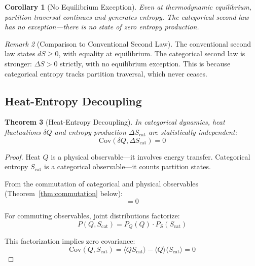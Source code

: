 \documentclass[twocolumn,10pt,a4paper]{article}
\newtheorem{theorem}{Theorem}[section]
\newtheorem{corollary}[theorem]{Corollary}
\theoremstyle{definition}
\theoremstyle{remark}
\newtheorem{remark}[theorem]{Remark}
\newcommand{\Ocat}{\hat{O}_{\mathrm{cat}}}
\newcommand{\Ophys}{\hat{O}_{\mathrm{phys}}}
\newcommand{\Scat}{S_{\mathrm{cat}}}
\begin{document}
\begin{corollary}[No Equilibrium Exception]
Even at thermodynamic equilibrium, partition traversal continues and generates entropy. The categorical second law has no exception---there is no state of zero entropy production.
\end{corollary}

\begin{remark}[Comparison to Conventional Second Law]
The conventional second law states $dS \geq 0$, with equality at equilibrium. The categorical second law is stronger: $\Delta S > 0$ strictly, with no equilibrium exception. This is because categorical entropy tracks partition traversal, which never ceases.
\end{remark}

\subsection{Heat-Entropy Decoupling}

\begin{theorem}[Heat-Entropy Decoupling]
\label{thm:decoupling}
In categorical dynamics, heat fluctuations $\delta Q$ and entropy production $\Delta \Scat$ are statistically independent:
\begin{equation}
    \text{Cov}(\delta Q, \Delta \Scat) = 0
\end{equation}
\end{theorem}

\begin{proof}
Heat $Q$ is a physical observable---it involves energy transfer. Categorical entropy $\Scat$ is a categorical observable---it counts partition states.

From the commutation of categorical and physical observables (Theorem~\ref{thm:commutation} below):
\begin{equation}
    [\Ocat, \Ophys] = 0
\end{equation}

For commuting observables, joint distributions factorize:
\begin{equation}
    P(Q, \Scat) = P_Q(Q) \cdot P_S(\Scat)
\end{equation}

This factorization implies zero covariance:
\begin{equation}
    \text{Cov}(Q, \Scat) = \langle Q \Scat \rangle - \langle Q \rangle \langle \Scat \rangle = 0
\end{equation}
\end{proof}
\end{document}
